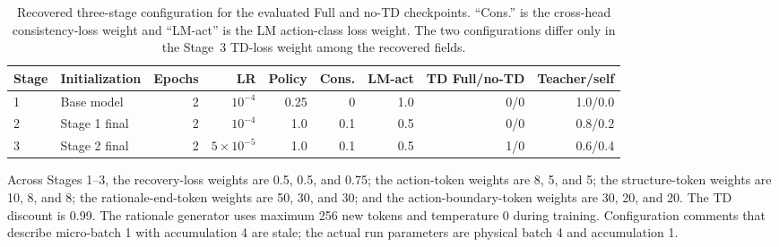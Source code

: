 \documentclass[manuscript,review,anonymous]{acmart}
\begin{document}
\begin{table}[t]
\centering
\small
\setlength{\tabcolsep}{3.5pt}
\begin{tabular}{llrrrrrrr}
\toprule
Stage & Initialization & Epochs & LR & Policy & Cons. & LM-act & TD Full/no-TD & Teacher/self \\
\midrule
1 & Base model & 2 & $10^{-4}$ & 0.25 & 0 & 1.0 & 0/0 & 1.0/0.0 \\
2 & Stage 1 final & 2 & $10^{-4}$ & 1.0 & 0.1 & 0.5 & 0/0 & 0.8/0.2 \\
3 & Stage 2 final & 2 & $5\times10^{-5}$ & 1.0 & 0.1 & 0.5 & 1/0 & 0.6/0.4 \\
\bottomrule
\end{tabular}
\caption{Recovered three-stage configuration for the evaluated Full and no-TD
checkpoints. ``Cons.'' is the cross-head consistency-loss weight and ``LM-act''
is the LM action-class loss weight. The two configurations differ only in the
Stage~3 TD-loss weight among the recovered fields.}
\label{tab:main-training-stages}
\end{table}

Across Stages 1--3, the recovery-loss weights are 0.5, 0.5, and 0.75; the
action-token weights are 8, 5, and 5; the structure-token weights are 10, 8,
and 8; the rationale-end-token weights are 50, 30, and 30; and the
action-boundary-token weights are 30, 20, and 20. The TD discount is 0.99.
The rationale generator uses maximum 256 new tokens and temperature 0 during
training. Configuration comments that describe micro-batch 1 with accumulation
4 are stale; the actual run parameters are physical batch 4 and accumulation 1.
\end{document}
